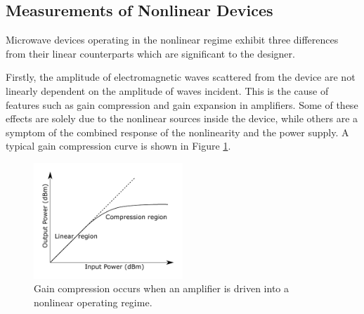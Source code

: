 \documentclass[../thesis/thesis.tex]{subfiles}
\begin{document}
\begin{refsection}
\section{Measurements of Nonlinear Devices}

Microwave devices operating in the nonlinear regime exhibit three differences from their linear counterparts which are significant to the designer.

Firstly, the amplitude of electromagnetic waves scattered from the device are not linearly dependent on the amplitude of waves incident. This is the cause of features such as gain compression and gain expansion in amplifiers. Some of these effects are solely due to the nonlinear sources inside the device, while others are a symptom of the combined response of the nonlinearity and the power supply. A typical gain compression curve is shown in Figure \ref{ch2_fig_comp}.

\begin{figure}
	\centering
	\includegraphics[width=0.5\textwidth]{ch2_compression}
	\caption{Gain compression occurs when an amplifier is driven into a nonlinear operating regime.}
	\label{ch2_fig_comp}
\end{figure}


\end{refsection}
\end{document}
